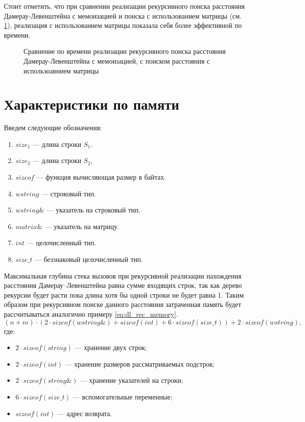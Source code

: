 Стоит отметить, что при сравнении реализации рекурсивного поиска расстояния Дамерау-Левенштейна с  мемоизацией и поиска
с использованием матрицы (см. \ref{plt:time_mat_rec_cmp}), реализация с использованием матрицы показала себя более эффективной
по времени. 

\begin{figure}[H]
	\centering
	
	\caption{Сравнение по времени реализации рекурсивного поиска расстояния Дамерау-Левенштейна с  мемоизацией, с поиском
	расстояния с использоавнием матрицы}
	\label{plt:time_mat_rec_cmp}
\end{figure}


\section{Характеристики по памяти}

Введем следующие обозначения:
\begin{enumerate}
	\item $size_{1}$ --- длина строки $S_{1}$.
	\item $size_{2}$ --- длина строки $S_{2}$,
	\item $sizeof$ --- функция вычисляющая размер в байтах.
	\item $wstring$ --- строковый тип.
	\item $wstring\&$ --- указатель на строковый тип.
	\item $matrix\&$ --- указатель на матрицу.
	\item $int$ --- целочисленный тип.
	\item $size\_t$ --- беззнаковый целочисленный тип.
\end{enumerate}

Максимальная глубина стека вызовов при рекурсивной реализации нахождения расстояния Дамерау--Левенштейна равна сумме входящих строк,
так как дерево рекурсии будет расти пока длина хотя бы одной строки не будет равна 1. Таким образом при рекурсивном поиске данного расстояния затраченная память
будет рассчитываться  аналогично примеру \ref{eq:dl_rec_memory}.
\begin{equation}
	\label{eq:dl_rec_memory}
	(n + m) \cdot (2 \cdot sizeof(wstring\&) + sizeof(int) + 6 \cdot sizeof(size\_t)) + 2 \cdot sizeof(wstring),
\end{equation}
где:
\begin{itemize}
	\item $2 \cdot sizeof(string)$ --- хранение двух строк;
	\item $2 \cdot sizeof(int)$ --- хранение размеров рассматриваемых подстрок;
	\item $2 \cdot sizeof(string\&)$ --- хранение указателей на строки;
	\item $6 \cdot sizeof(size\_t)$ --- вспомогательные переменные;
	\item $sizeof(int)$ --- адрес возврата.
\end{itemize}

